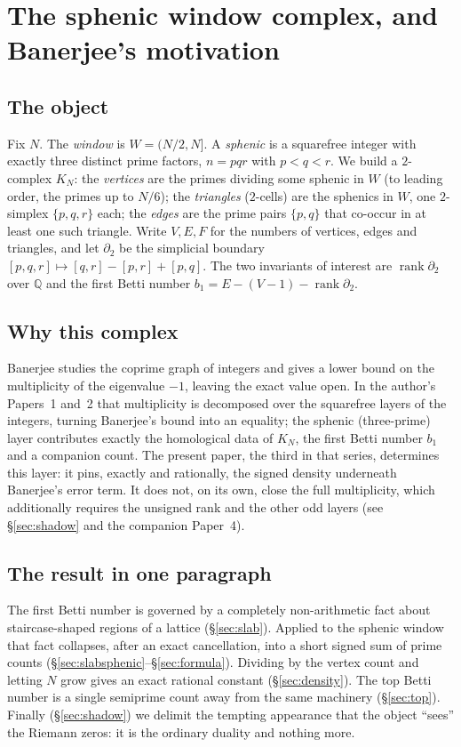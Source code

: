 \documentclass[11pt,reqno]{amsart}
\theoremstyle{plain}
\theoremstyle{definition}
\theoremstyle{plain}
\newcommand{\rank}{\operatorname{rank}}
\newcommand{\Q}{\mathbb{Q}}
\begin{document}
\maketitle

\section{The sphenic window complex, and Banerjee's motivation}

\subsection{The object}
Fix $N$. The \emph{window} is $W=(N/2,N]$. A \emph{sphenic} is a squarefree integer with
exactly three distinct prime factors, $n=pqr$ with $p<q<r$. We build a $2$-complex $K_N$: the
\emph{vertices} are the primes dividing some sphenic in $W$ (to leading order, the primes up
to $N/6$); the \emph{triangles} ($2$-cells) are the sphenics in $W$, one $2$-simplex
$\{p,q,r\}$ each; the \emph{edges} are the prime pairs $\{p,q\}$ that co-occur in at least one
such triangle. Write $V,E,F$ for the numbers of vertices, edges and triangles, and let
$\partial_2$ be the simplicial boundary $[p,q,r]\mapsto[q,r]-[p,r]+[p,q]$. The two invariants
of interest are $\rank\partial_2$ over $\Q$ and the first Betti number
$b_1=E-(V-1)-\rank\partial_2$.

\subsection{Why this complex}
Banerjee \cite{Banerjee2025} studies the coprime graph of integers and gives a lower bound on
the multiplicity of the eigenvalue $-1$, leaving the exact value open. In the author's
Papers~1 and~2 \cite{Rich2026a,Rich2026b} that multiplicity is decomposed over the squarefree
layers of the integers, turning Banerjee's bound into an equality; the sphenic (three-prime)
layer contributes exactly the homological data of $K_N$, the first Betti number $b_1$ and a
companion count. The present paper, the third in that series, determines this layer: it pins,
exactly and rationally, the signed density underneath Banerjee's error term. It does not, on
its own, close the full multiplicity, which additionally requires the unsigned rank and the
other odd layers (see \S\ref{sec:shadow} and the companion Paper~4).

\subsection{The result in one paragraph}
The first Betti number is governed by a completely non-arithmetic fact about staircase-shaped
regions of a lattice (\S\ref{sec:slab}). Applied to the sphenic window that fact collapses,
after an exact cancellation, into a short signed sum of prime counts
(\S\ref{sec:slabsphenic}--\S\ref{sec:formula}). Dividing by the vertex count and letting $N$
grow gives an exact rational constant (\S\ref{sec:density}). The top Betti number is a single
semiprime count away from the same machinery (\S\ref{sec:top}). Finally
(\S\ref{sec:shadow}) we delimit the tempting appearance that the object ``sees'' the Riemann
zeros: it is the ordinary duality and nothing more.
\end{document}
